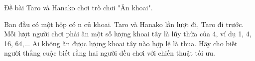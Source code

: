 Đề bài  
Taro và Hanako chơi trò chơi "Ăn khoai".  

   Ban đầu có một hộp có n củ khoai. Taro và Hanako lần lượt đi, Taro đi trước. Mỗi lượt người chơi phải ăn một số lượng khoai tây là lũy thừa của 4, ví dụ 1, 4, 16, 64,... Ai không ăn được lượng khoai tây nào hợp lệ là thua. Hãy cho biết người thắng cuộc biết rằng hai người đều chơi với chiến thuật tối ưu.